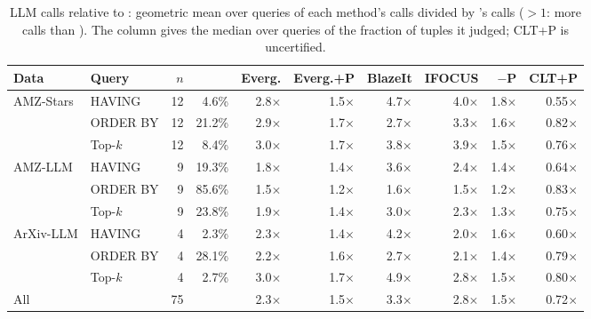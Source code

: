 \begin{table}[t]
\centering
\caption{LLM calls relative to \sys{}: geometric mean over queries of each method's calls divided by \sys{}'s calls ($>1$: more calls than \sys{}). The \sys{} column gives the median over queries of the fraction of tuples it judged; CLT+P is uncertified.}
\label{tab:main}
\setlength{\tabcolsep}{3pt}
\footnotesize
\begin{tabular}{llrrrrrrrr}
\toprule
Data & Query & $n$ & \sys{} & Everg. & Everg.+P & BlazeIt & IFOCUS & \sys{}$-$P & CLT+P \\
\midrule
AMZ-Stars & HAVING & 12 & 4.6\% & 2.8$\times$ & 1.5$\times$ & 4.7$\times$ & 4.0$\times$ & 1.8$\times$ & 0.55$\times$ \\
 & ORDER BY & 12 & 21.2\% & 2.9$\times$ & 1.7$\times$ & 2.7$\times$ & 3.3$\times$ & 1.6$\times$ & 0.82$\times$ \\
 & Top-$k$ & 12 & 8.4\% & 3.0$\times$ & 1.7$\times$ & 3.8$\times$ & 3.9$\times$ & 1.5$\times$ & 0.76$\times$ \\
\midrule
AMZ-LLM & HAVING & 9 & 19.3\% & 1.8$\times$ & 1.4$\times$ & 3.6$\times$ & 2.4$\times$ & 1.4$\times$ & 0.64$\times$ \\
 & ORDER BY & 9 & 85.6\% & 1.5$\times$ & 1.2$\times$ & 1.6$\times$ & 1.5$\times$ & 1.2$\times$ & 0.83$\times$ \\
 & Top-$k$ & 9 & 23.8\% & 1.9$\times$ & 1.4$\times$ & 3.0$\times$ & 2.3$\times$ & 1.3$\times$ & 0.75$\times$ \\
\midrule
ArXiv-LLM & HAVING & 4 & 2.3\% & 2.3$\times$ & 1.4$\times$ & 4.2$\times$ & 2.0$\times$ & 1.6$\times$ & 0.60$\times$ \\
 & ORDER BY & 4 & 28.1\% & 2.2$\times$ & 1.6$\times$ & 2.7$\times$ & 2.1$\times$ & 1.4$\times$ & 0.79$\times$ \\
 & Top-$k$ & 4 & 2.7\% & 3.0$\times$ & 1.7$\times$ & 4.9$\times$ & 2.8$\times$ & 1.5$\times$ & 0.80$\times$ \\
\midrule
All & & 75 & & 2.3$\times$ & 1.5$\times$ & 3.3$\times$ & 2.8$\times$ & 1.5$\times$ & 0.72$\times$ \\
\bottomrule
\end{tabular}
\end{table}